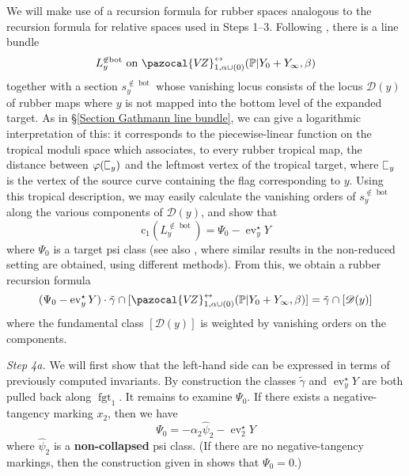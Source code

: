 \documentclass[11pt]{amsart}
\newcommand{\sqC}{\scalebox{0.8}[1.3]{$\sqsubset$}}
\newcommand{\VZ}{\pazocal{V\!Z}}
\newcommand{\st}{\star}
\newcommand{\ev}{\operatorname{ev}}
\newcommand{\fgt}{\operatorname{fgt}}
\newcommand{\Dcal}{\mathcal{D}}
\newcommand{\cchern}{\mathrm{c}}
\theoremstyle{definition}
\theoremstyle{definition}
\begin{document}
We will make use of a recursion formula for rubber spaces analogous to the recursion formula for relative spaces used in Steps 1--3. Following \cite{EKatz}, there is a line bundle
\begin{equation*} L_y^{\not\in \operatorname{bot}} \text{ on } \VZ^{\leftrightarrow}_{1,\alpha\cup (0)}(\mathbb P|Y_0+Y_\infty,\beta)\end{equation*}
together with a section $s_y^{\not\in\operatorname{bot}}$ whose vanishing locus consists of the locus $\Dcal(y)$ of rubber maps where $y$ is not mapped into the bottom level of the expanded target. As in \S \ref{Section Gathmann line bundle}, we can give a logarithmic interpretation of this: it corresponds to the piecewise-linear function on the tropical moduli space which associates, to every rubber tropical map, the distance between $\varphi(\sqC_y)$ and the leftmost vertex of the tropical target, where $\sqC_y$ is the vertex of the source curve containing the flag corresponding to $y$. Using this tropical description, we may easily calculate the vanishing orders of $s_y^{\not\in\operatorname{bot}}$ along the various components of $\Dcal(y)$, and show that
\begin{equation*}\cchern_1(L_y^{\not\in\operatorname{bot}}) = \Psi_0 - \ev_y^\st Y\end{equation*}
where $\Psi_0$ is a target psi class (see also \cite{EKatzLB}, where similar results in the non-reduced setting are obtained, using different methods). From this, we obtain a rubber recursion formula
\begin{equation}\label{step 4 recursion} (\Psi_0 - \ev_y^\st Y)\cdot \tilde\gamma \cap [\VZ^{\leftrightarrow}_{1,\alpha\cup(0)}(\mathbb P|Y_0+Y_\infty,\beta)] = \tilde\gamma \cap [\Dcal(y)]\end{equation}
where the fundamental class $[\Dcal(y)]$ is weighted by vanishing orders on the components.\medskip

\noindent \emph{Step 4a.} We will first show that the left-hand side can be expressed in terms of previously computed invariants. By construction the classes $\tilde\gamma$ and $\ev_y^\star Y$ are both pulled back along $\fgt_{1}$. It remains to examine $\Psi_0$. If there exists a negative-tangency marking $x_2$, then we have \cite[Construction 5.1.17]{GathmannThesis}
\begin{equation*}\label{Psi0 formula} \Psi_0 = -\alpha_2 \hat\psi_2 - \ev_2^\st Y \end{equation*}
where $\hat\psi_2$ is a \textbf{non-collapsed} psi class. (If there are no negative-tangency markings, then the construction given in \cite[\S 1.5.2]{MaulikPandharipande} shows that $\Psi_0=0$.)
\end{document}
